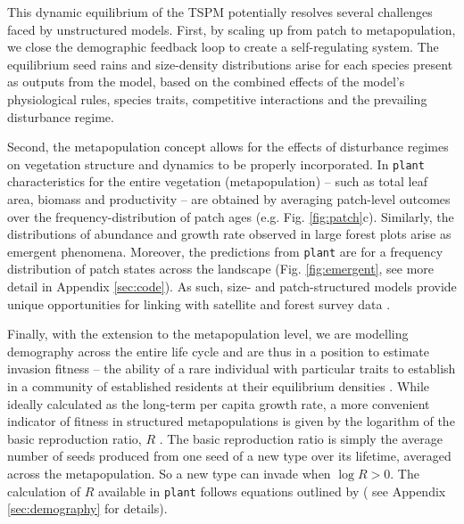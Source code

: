 \documentclass[a4paper,11pt]{article}
\newcommand{\plant}{\texttt{plant}}
\begin{document}
This dynamic equilibrium of the \textsc{TSPM} potentially resolves several
challenges faced by unstructured models. First, by scaling up from
patch to metapopulation, we close the demographic feedback loop to
create a self-regulating system. The equilibrium seed rains and size-density distributions  arise for each species present as outputs from the model, based on the combined effects of the model's physiological rules, species traits, competitive interactions
and the prevailing disturbance regime.

Second, the metapopulation concept allows for the effects of disturbance
regimes on vegetation structure and dynamics to be properly incorporated. In
{\plant} characteristics for the entire vegetation (metapopulation) -- such
as total leaf area, biomass and productivity -- are obtained by averaging
patch-level outcomes over the frequency-distribution of patch ages (e.g.
Fig. \ref{fig:patch}c).  Similarly, the distributions of  abundance and growth rate
observed in large forest  plots \citep[e.g.][]{Muller-2006, Coomes-2007} arise
as  emergent phenomena. Moreover, the predictions from {\plant}
are for a frequency distribution of patch states across the landscape
(Fig. \ref{fig:emergent}, see more detail in Appendix \ref{sec:code}). As such,
size- and patch-structured models provide unique opportunities for linking with
satellite and forest survey data \citep{Moorcroft-2001, Purves-2008}.

Finally, with the extension to the metapopulation level, we are
modelling demography across the entire life cycle and are thus in a
position to estimate invasion fitness -- the ability of a rare
individual with particular traits to establish in a community of
established residents at their equilibrium densities
\citep{Metz-1992, Chesson-2000}.  While ideally calculated as the
long-term per capita growth rate, a more convenient indicator of
fitness in structured metapopulations is given by the
logarithm of the basic reproduction ratio, \(R\) \citep{Gyllenberg-2001, Metz-2001}. The basic reproduction ratio is simply the average number of seeds produced from one seed of a new type over its lifetime, averaged across the metapopulation. So a new type can
invade when \(\log R > 0\). The calculation of \(R\) available in
{\plant} follows equations outlined by \citet{Falster-2015} (
see Appendix \ref{sec:demography} for details).
\end{document}
